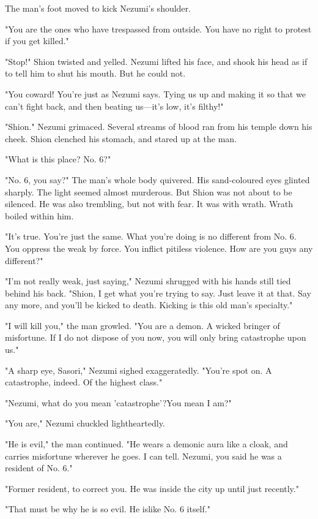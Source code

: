 The man's foot moved to kick Nezumi's shoulder.

"You are the ones who have trespassed from outside. You have no right to
protest if you get killed."

"Stop!" Shion twisted and yelled. Nezumi lifted his face, and shook his
head as if to tell him to shut his mouth. But he could not.

"You coward! You're just as Nezumi says. Tying us up and making it so
that we can't fight back, and then beating us---it's low, it's filthy!"

"Shion." Nezumi grimaced. Several streams of blood ran from his temple
down his cheek. Shion clenched his stomach, and stared up at the man.

"What is this place? No. 6?"

"No. 6, you say?" The man's whole body quivered. His sand-coloured eyes
glinted sharply. The light seemed almost murderous. But Shion was not
about to be silenced. He was also trembling, but not with fear. It was
with wrath. Wrath boiled within him.

"It's true. You're just the same. What you're doing is no different from
No. 6. You oppress the weak by force. You inflict pitiless violence. How
are you guys any different?"

"I'm not really weak, just saying," Nezumi shrugged with his hands still
tied behind his back. "Shion, I get what you're trying to say. Just
leave it at that. Say any more, and you'll be kicked to death. Kicking
is this old man's specialty."

"I will kill you," the man growled. "You are a demon. A wicked bringer
of misfortune. If I do not dispose of you now, you will only bring
catastrophe upon us."

"A sharp eye, Sasori," Nezumi sighed exaggeratedly. "You're spot on. A
catastrophe, indeed. Of the highest class."

"Nezumi, what do you mean 'catastrophe'?\el You mean I am?"

"You are," Nezumi chuckled lightheartedly.

"He is evil," the man continued. "He wears a demonic aura like a cloak,
and carries misfortune wherever he goes. I can tell. Nezumi, you said he
was a resident of No. 6."

"Former resident, to correct you. He was inside the city up until just
recently."

"That must be why he is so evil. He is\el like No. 6 itself."

